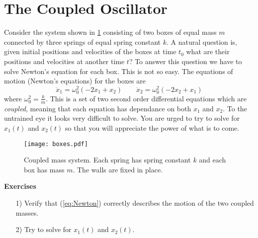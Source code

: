 \section{The Coupled Oscillator}
Consider the system shown in \ref{Fig:CoupledMasses} consisting of two boxes of equal mass $m$ connected by three springs of equal spring constant $k$.  A natural question is, given initial positions and velocities of the boxes at time $t_{0}$ what are their positions and velocities at another time $t$?  To answer this question we have to solve Newton's equation for each box.  This is not so easy.  The equations of motion (Newton's equations) for the boxes are
\begin{equation} \label{eq:Newton}
\ddot{x}_{1} = \omega_{0}^{2} (-2x_{1} + x_{2}) \qquad
\ddot{x}_{2} = \omega_{0}^{2} (-2x_{2} + x_{1})
\end{equation}
where $\omega^{2}_{0} = \frac{k}{m}$.  This is a set of two second order differential equations which are \textit{coupled}, meaning that each equation has dependance on both $x_1$ and $x_2$.  To the untrained eye it looks very difficult to solve.  You are urged to try to solve for $x_{1}(t)$ and $x_{2}(t)$ so that you will appreciate the power of what is to come.

\begin{figure}
\begin{centering}
\texttt{[image: boxes.pdf]}
\par\end{centering}
\caption{Coupled mass system. Each spring has spring constant $k$ and each box has mass $m$. The walls are fixed in place.}
\label{Fig:CoupledMasses}
\end{figure}

\begin{flushleft}\textbf{Exercises}\end{flushleft} %
\begin{itemize}\item[1)] Verify that (\ref{eq:Newton}) correctly describes the motion of the two coupled masses.\item[2)] Try to solve for $x_{1}(t)$ and $x_{2}(t)$.\end{itemize}
